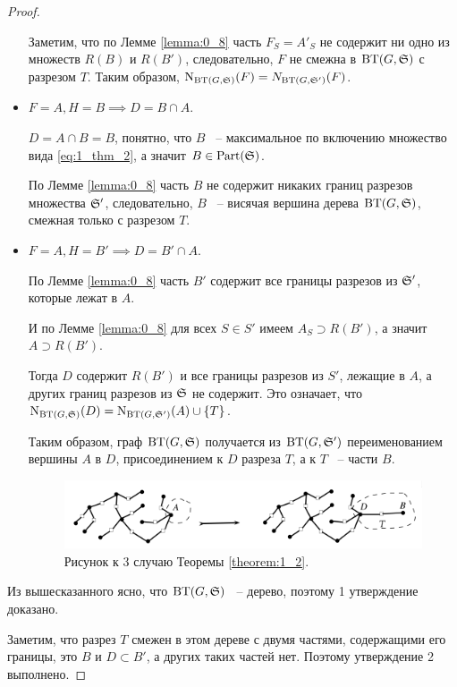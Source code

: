 \begin{proof}
\begin{itemize}
			Заметим, что по Лемме \ref{lemma:0_8} часть $F_S = A'_S$ не содержит ни одно из множеств $R(B)$ и $R(B')$, следовательно, $F$ не смежна в $\BT(G, \S)$ с разрезом $T$. Таким образом, $\N_{\BT(G, \S)}(F) = N_{\BT(G, \S')}(F)$.

		\item $F = A, H = B \implies D = B \cap A$.

			$D = A \cap B = B$, понятно, что $B$ ~-- максимальное по включению множество вида \eqref{eq:1_thm_2}, а значит $B \in \Part(\S)$.

			По Лемме \ref{lemma:0_8} часть $B$ не содержит никаких границ разрезов множества $\S'$, следовательно, $B$ ~-- висячая вершина дерева $\BT(G, \S)$, смежная только с разрезом $T$.

		\item $F = A, H = B' \implies D = B' \cap A$.

			По Лемме \ref{lemma:0_8} часть $B' $ содержит все границы разрезов из $\S'$, которые лежат в $A$.

			И по Лемме \ref{lemma:0_8} для всех $S \in S'$ имеем $A_S \supset R(B')$, а значит $A \supset R(B')$.

			Тогда $D$ содержит $R(B')$ и все границы разрезов из $S'$, лежащие в $A$, а других границ разрезов из $\S$ не содержит. Это означает, что $\N_{\BT(G, \S)}(D) = \N_{\BT(G, \S')}(A) \cup \{T\}$.

			Таким образом, граф $\BT(G, \S)$ получается из $\BT(G, \S')$ переименованием вершины $A$ в $D$, присоединением к $D$ разреза $T$, а к $T$ ~-- части $B$.

\begin{figure}[ht]
    \centering
	\includegraphics[width=0.6\columnwidth]{figures/theorem_1_2_case_3.png}
	\caption{Рисунок к 3 случаю Теоремы \ref{theorem:1_2}.}
    \label{fig:theorem_1_2_case_3}
\end{figure}

	\end{itemize}

	Из вышесказанного ясно, что $\BT(G, \S)$ ~-- дерево, поэтому 1 утверждение доказано.

	Заметим, что разрез $T$ смежен в этом дереве с двумя частями, содержащими его границы, это $B$ и $D \subset B'$, а других таких частей нет. Поэтому утверждение 2 выполнено.


\end{proof}
